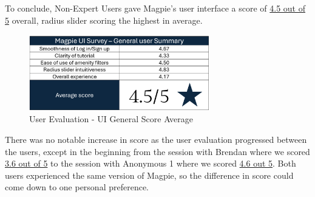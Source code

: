 \newpage{}

To conclude, Non-Expert Users gave Magpie's user interface a score of
\underline{4.5 out of 5} overall, radius slider scoring the highest in average.
\begin{figure}[h!]
  \centering
  \includegraphics[width=0.7\textwidth]{images/survey-casual-summary.png}
  \caption{User Evaluation - UI General Score Average}
\end{figure}

There was no notable increase in score as the user evaluation progressed between
the users, except in the beginning from the session with Brendan where we scored
\underline{3.6 out of 5} to the session with Anonymous 1 where we scored
\underline{4.6 out 5}. Both users experienced the same version of Magpie, so the
difference in score could come down to one personal preference.